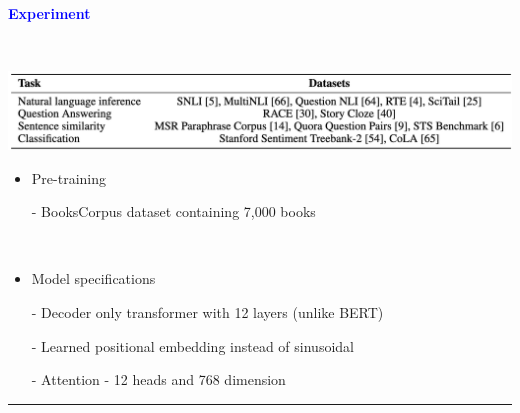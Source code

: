 \documentclass[professionalfont]{beamer}
\begin{document}
\begin{frame}
\begin{refsection}

\begin{center}
    { \textbf{\textcolor{blue}{ {\fontsize{12}{14}\selectfont Experiment} }} }
\end{center}
\\[0.3cm]

\begin{center}
    \includegraphics[width=1.0\textwidth]{table/1.png}
\end{center}

{\fontsize{10}{14}\selectfont 
\begin{itemize}
    \item Pre-training

    - BooksCorpus dataset containing 7,000 books \cite{books-corpus}

    \\[0.3cm]

    \item Model specifications

    - Decoder only transformer with 12 layers (unlike BERT)

    - Learned positional embedding instead of sinusoidal

    - Attention - 12 heads and 768 dimension
\end{itemize}
}

\vspace{0.2cm}
\hrule
\printbibliography

\end{refsection}
\end{frame}
\end{document}
